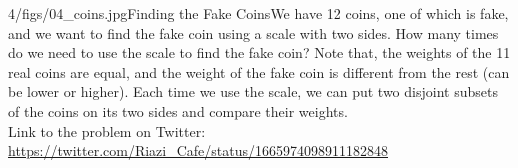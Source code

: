 \begin{problem}{4/figs/04_coins.jpg}{Finding the Fake Coins}We have 12 coins, one of which is fake, and we want to find the fake coin using a scale with two sides. How many times do we need to use the scale to find the fake coin? Note that, the weights of the 11 real coins are equal, and the weight of the fake coin is different from the rest (can be lower or higher). Each time we use the scale, we can put two disjoint subsets of the coins on its two sides and compare their weights.\\[0.2cm]

Link to the problem on Twitter:  \url{https://twitter.com/Riazi_Cafe/status/1665974098911182848}\end{problem}